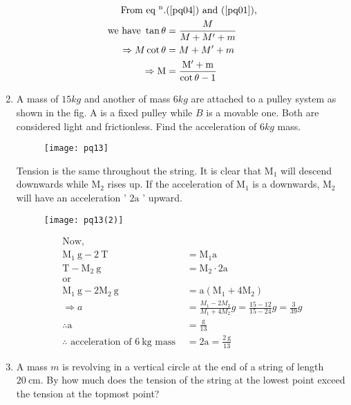 \begin{enumerate}[label=\color{ocre}\textbf{\arabic*.}]
\begin{answer}
\begin{align}
		\text{From eq $^{\mathrm{n}}$.} &\text{(\ref{pq04}) and (\ref{pq01}),}\notag\\
		\text{we have }\tan \theta&=\frac{M}{M+M^{\prime}+m} \notag\\
		\Rightarrow M \cot \theta&=M+M^{\prime}+m\notag\\
		\Rightarrow \mathrm{M}&=\frac{\mathrm{M}^{\prime}+\mathrm{m}}{\cot \theta-1}\notag
		\end{align}
	\end{answer}
	\item A mass of $15 kg$ and another of mass $6kg$ are attached to a pulley system as shown in the fig. A is a fixed pulley while $B$ is a movable one. Both are considered light and frictionless. Find the acceleration of $6kg$ mass.
	\begin{figure}[H]
		\centering
		\texttt{[image: pq13]}
	\end{figure}
	\begin{answer}
		Tension is the same throughout the string. It is clear that $\mathrm{M}_{1}$ will descend downwards while $\mathrm{M}_{2}$ rises up. If the acceleration of $\mathrm{M}_{1}$ is a downwards, $\mathrm{M}_{2}$ will have an acceleration ' $2 \mathrm{a}$ ' upward.
		\begin{figure}[H]
			\centering
			\texttt{[image: pq13(2)]}
		\end{figure}
		\begin{align*}
		\text{Now,}\hspace{2cm}\\
		\mathrm{M}_{1} \mathrm{~g}-2 \mathrm{~T}&=\mathrm{M}_{1} \mathrm{a}\\
		\mathrm{T}-\mathrm{M}_{2} \mathrm{~g}&=\mathrm{M}_{2} \cdot 2 \mathrm{a}\\
		\text{or}\hspace{2cm}\\
		\mathrm{M}_{1} \mathrm{~g}-2 \mathrm{M}_{2} \mathrm{~g}&=\mathrm{a}\left(\mathrm{M}_{1}+4 \mathrm{M}_{2}\right)\\
		\Rightarrow a&=\frac{M_{1}-2 M_{2}}{M_{1}+4 M_{2}} g=\frac{15-12}{15-24} g=\frac{3}{39} g\\
		\therefore \mathrm{a}&=\frac{\mathrm{g}}{13}\\
		\therefore \text{ acceleration of }6 \mathrm{~kg}\text{ mass }&=2 \mathrm{a}=\frac{2 \mathrm{~g}}{13}
		\end{align*}
	\end{answer}
	\item A mass $m$ is revolving in a vertical circle at the end of a string of length $20 \mathrm{~cm}$. By how much does the tension of the string at the lowest point exceed the tension at the topmost point?

\end{enumerate}
